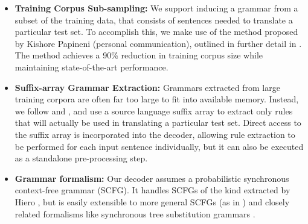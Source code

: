 \documentclass[11pt]{article}
\newcommand{\ignore}[1]{}
\begin{document}
\begin{itemize}
\item \textbf{Training Corpus Sub-sampling:} We support inducing a grammar from
a subset of the training data, that consists of sentences needed to translate a particular
test set.  To accomplish this, we make use of the method proposed by Kishore
Papineni (personal communication), outlined in further detail in \cite{Joshua-WMT}.
The method achieves a 90\% reduction in training
corpus size while maintaining state-of-the-art performance.


\item \textbf{Suffix-array Grammar Extraction:}
Grammars extracted from large training corpora are often far too large to fit
into available memory.
Instead, we follow  and , and
use a source language suffix array to extract only rules that will actually be
used in translating a particular test set.
Direct access to the suffix array is incorporated into the decoder, allowing
rule extraction to be performed for each input sentence individually, but
it can also be executed as a standalone pre-processing step.

\item \textbf{Grammar formalism:} Our decoder assumes a probabilistic synchronous
context-free grammar (SCFG). It handles SCFGs of the kind extracted
by Hiero \cite{Chiang2007}, but is easily extensible to more general SCFGs (as in
) and closely related formalisms like synchronous tree
substitution grammars \cite{Eisner2003}.


\end{itemize}
\end{document}

